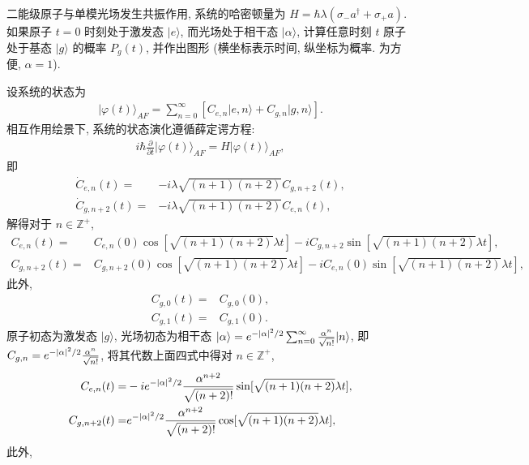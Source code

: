 \documentclass{assignment}
\begin{document}
\begin{prob}
    二能级原子与单模光场发生共振作用, 系统的哈密顿量为 $H=\hbar\lambda(\sigma_-a^{\dagger}+\sigma_+a)$. 如果原子 $t=0$ 时刻处于激发态 $\lvert e\rangle$, 而光场处于相干态 $\lvert\alpha\rangle$, 计算任意时刻 $t$ 原子处于基态 $\lvert g\rangle$ 的概率 $P_g(t)$, 并作出图形 (横坐标表示时间, 纵坐标为概率. 为方便, $\alpha=1$).
\end{prob}
\begin{sol}
    设系统的状态为
    \begin{align}
        \lvert\varphi(t)\rangle_{AF}=\sum_{n=0}^{\infty}[C_{e,n}\lvert e,n\rangle+C_{g,n}\lvert g,n\rangle].
    \end{align}
    相互作用绘景下, 系统的状态演化遵循薛定谔方程:
    \begin{align}
        i\hbar\frac{\partial}{\partial t}\lvert\varphi(t)\rangle_{AF}=H\lvert\varphi(t)\rangle_{AF},
    \end{align}
    即
    \begin{align}
        \dot{C}_{e,n}(t)=&-i\lambda\sqrt{(n+1)(n+2)}C_{g,n+2}(t),\\
        \dot{C}_{g,n+2}(t)=&-i\lambda\sqrt{(n+1)(n+2)}C_{e,n}(t),
    \end{align}
    解得对于 $n\in\mathbb{Z}^+$,
    \begin{align}
        C_{e,n}(t)=&C_{e,n}(0)\cos[\sqrt{(n+1)(n+2)}\lambda t]-iC_{g,n+2}\sin[\sqrt{(n+1)(n+2)}\lambda t],\\
        C_{g,n+2}(t)=&C_{g,n+2}(0)\cos[\sqrt{(n+1)(n+2)}\lambda t]-iC_{e,n}(0)\sin[\sqrt{(n+1)(n+2)}\lambda t],
    \end{align}
    此外,
    \begin{align}
        C_{g,0}(t)=&C_{g,0}(0),\\
        C_{g,1}(t)=&C_{g,1}(0).
    \end{align}
    原子初态为激发态 $\lvert g\rangle$, 光场初态为相干态 $\lvert\alpha\rangle=e^{-\left\lvert\alpha\right\rvert^2/2}\sum_{n=0}^{\infty}\frac{\alpha^n}{\sqrt{n!}}\lvert n\rangle$, 即 $C_{g,n}=e^{-\left\lvert\alpha\right\rvert^2/2}\frac{\alpha^n}{\sqrt{n!}}$, 将其代数上面四式中得对 $n\in\mathbb{Z}^+$,
    \begin{align}
        C_{e,n}(t)=&-ie^{-\left\lvert\alpha\right\rvert^2/2}\frac{\alpha^{n+2}}{\sqrt{(n+2)!}}\sin[\sqrt{(n+1)(n+2)}\lambda t],\\
        C_{g,n+2}(t)=&e^{-\left\lvert\alpha\right\rvert^2/2}\frac{\alpha^{n+2}}{\sqrt{(n+2)!}}\cos[\sqrt{(n+1)(n+2)}\lambda t],
    \end{align}
    此外,
    \begin{align}

\end{align}
\end{sol}
\end{document}
